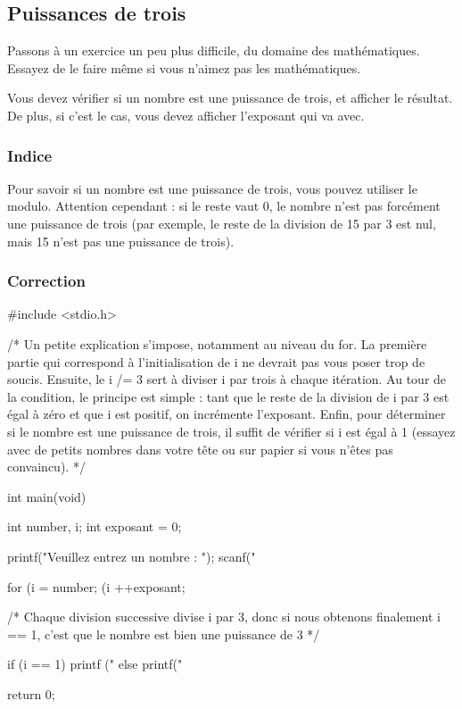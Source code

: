 \subsection{Puissances de trois}
\label{puissances-de-trois}

Passons à un exercice un peu plus difficile, du domaine des
mathématiques. Essayez de le faire même si vous n'aimez pas les
mathématiques.

Vous devez vérifier si un nombre est une puissance de trois, et afficher
le résultat. De plus, si c'est le cas, vous devez afficher l'exposant
qui va avec.

\subsubsection*{Indice}
\label{indice-3}

\begin{secretbox}
  Pour savoir si un nombre est une puissance
de trois, vous pouvez utiliser le modulo. Attention cependant : si le
reste vaut 0, le nombre n'est pas forcément une puissance de trois (par
exemple, le reste de la division de 15 par 3 est nul, mais 15 n'est pas
une puissance de trois).
\end{secretbox}

\subsubsection*{Correction}
\label{correction-8}

\begin{C}
 #include <stdio.h>


/* Un petite explication s'impose, notamment au niveau du for. La première
partie qui correspond à l'initialisation de i ne devrait pas vous poser
trop de soucis. Ensuite, le i /= 3 sert à diviser i par trois à chaque
itération. Au tour de la condition, le principe est simple : tant que le
reste de la division de i par 3 est égal à zéro et que i est positif, on
incrémente l'exposant. Enfin, pour déterminer si le nombre est une puissance
de trois, il suffit de vérifier si i est égal à 1 (essayez avec de petits
nombres dans votre tête ou sur papier si vous n'êtes pas convaincu). */ 

int main(void)
{
    int number, i;
    int exposant = 0;

    printf("Veuillez entrez un nombre : ");
    scanf("%

    for (i = number; (i %
    {
        ++exposant;
    }

    /* Chaque division successive divise i par 3, donc si nous obtenons finalement
    i == 1, c'est que le nombre est bien une puissance de 3 */

    if (i == 1)
    {
        printf ("%
    }
    else
    {
        printf("%
    }

    return 0;
}
\end{C}

